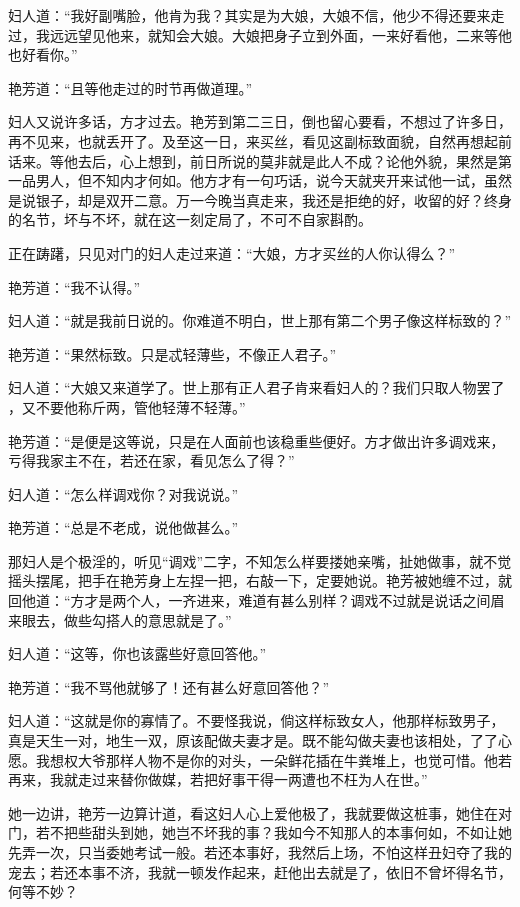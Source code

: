 \documentclass[a4paper,12pt,UTF8,twoside]{ctexbook}
\begin{document}
妇人道：“我好副嘴脸，他肯为我？其实是为大娘，大娘不信，他少不得还要来走过，我远远望见他来，就知会大娘。大娘把身子立到外面，一来好看他，二来等他也好看你。”

艳芳道：“且等他走过的时节再做道理。”

妇人又说许多话，方才过去。艳芳到第二三日，倒也留心要看，不想过了许多日，再不见来，也就丢开了。及至这一日，来买丝，看见这副标致面貌，自然再想起前话来。等他去后，心上想到，前日所说的莫非就是此人不成？论他外貌，果然是第一品男人，但不知内才何如。他方才有一句巧话，说今天就夹开来试他一试，虽然是说银子，却是双开二意。万一今晚当真走来，我还是拒绝的好，收留的好？终身的名节，坏与不坏，就在这一刻定局了，不可不自家斟酌。

正在踌躇，只见对门的妇人走过来道：“大娘，方才买丝的人你认得么？”

艳芳道：“我不认得。”

妇人道：“就是我前日说的。你难道不明白，世上那有第二个男子像这样标致的？”

艳芳道：“果然标致。只是忒轻薄些，不像正人君子。”

妇人道：“大娘又来道学了。世上那有正人君子肯来看妇人的？我们只取人物罢了 ，又不要他称斤两，管他轻薄不轻薄。”

艳芳道：“是便是这等说，只是在人面前也该稳重些便好。方才做出许多调戏来，亏得我家主不在，若还在家，看见怎么了得？”

妇人道：“怎么样调戏你？对我说说。”

艳芳道：“总是不老成，说他做甚么。”

那妇人是个极淫的，听见“调戏”二字，不知怎么样要搂她亲嘴，扯她做事，就不觉摇头摆尾，把手在艳芳身上左捏一把，右敲一下，定要她说。艳芳被她缠不过，就回他道：“方才是两个人，一齐进来，难道有甚么别样？调戏不过就是说话之间眉来眼去，做些勾搭人的意思就是了。”

妇人道：“这等，你也该露些好意回答他。”

艳芳道：“我不骂他就够了！还有甚么好意回答他？”

妇人道：“这就是你的寡情了。不要怪我说，倘这样标致女人，他那样标致男子，真是天生一对，地生一双，原该配做夫妻才是。既不能勾做夫妻也该相处，了了心愿。我想权大爷那样人物不是你的对头，一朵鲜花插在牛粪堆上，也觉可惜。他若再来，我就走过来替你做媒，若把好事干得一两遭也不枉为人在世。”

她一边讲，艳芳一边算计道，看这妇人心上爱他极了，我就要做这桩事，她住在对门，若不把些甜头到她，她岂不坏我的事？我如今不知那人的本事何如，不如让她先弄一次，只当委她考试一般。若还本事好，我然后上场，不怕这样丑妇夺了我的宠去；若还本事不济，我就一顿发作起来，赶他出去就是了，依旧不曾坏得名节，何等不妙？
\end{document}
